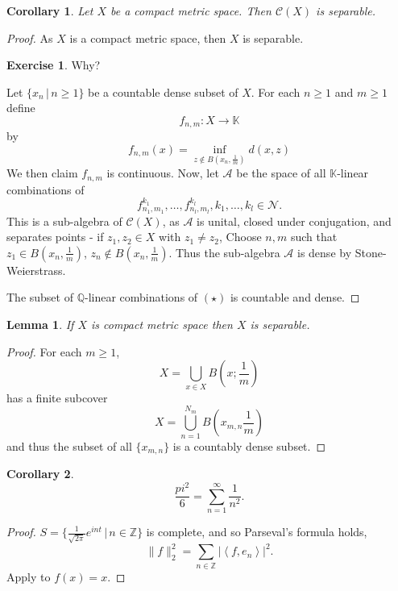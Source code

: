 \documentclass[10pt, oneside, reqno]{amsart}
\theoremstyle{plain}%
\newtheorem{lem}[thm]{Lemma}
\newtheorem*{cor}{Corollary}
\theoremstyle{definition}
\newtheorem{exer}[thm]{Exercise}
\theoremstyle{remark}
\newcommand{\given}{ \, | \,}
\newcommand{\Q}{\mathbb{Q}}
\newcommand{\K}{\mathbb{K}}
\newcommand{\Z}{\mathbb{Z}}
\newcommand{\iprod}[1]{\left\langle #1 \right\rangle}
\begin{document}
\begin{cor}
    Let $X$ be a compact metric space.  Then $\mathcal C(X)$ is separable.
\end{cor}
\begin{proof}
    As $X$ is a compact metric space, then $X$ is separable.  
    \begin{exer}
        Why?
    \end{exer}
    Let $\{ x_n \given n \geq 1 \}$ be a countable dense subset of $X$.  For each $n \geq 1$ and $m \geq 1$ define \[
        f_{n,m} : X \rightarrow \K
    \] by \[f_{n,m}(x) = \inf_{z \notin B(x_n, \frac{1}{m})} d(x,z)\]
    We then claim $f_{n,m}$ is continuous.  Now, let $\mathcal{A}$ be the space of all $\K$-linear combinations of \begin{equation*}
        f^{k_1}_{n_1,m_1}, \dots, f_{n_l, m_l}^{k_l}, k_1, \dots, k_l \in \mathcal{N}. \tag{$\star$}
    \end{equation*}
 This is a sub-algebra of $\mathcal C(X)$, as $\mathcal A$ is unital, closed under conjugation, and separates points - if $z_1, z_2 \in X$ with $z_1 \neq z_2$, Choose $n,m$ such that $z_1 \in B(x_n, \frac{1}{m})$, $z_n \notin B(x_n, \frac{1}{m})$.  Thus the sub-algebra $\mathcal A$ is dense by Stone-Weierstrass.  
    
    The subset of $\Q$-linear combinations of $(\star)$ is countable and dense.
\end{proof}

\begin{lem}
    If $X$ is compact metric space then $X$ is separable.  
\end{lem}
\begin{proof}
    For each $m \geq 1$, \[
        X = \bigcup_{x \in X} B(x ; \frac{1}{m})
    \]  has a finite subcover \[
        X = \bigcup_{n=1}^{N_m} B(x_{m,n} \frac{1}{m})
    \] and thus the subset of all $\{x_{m,n} \}$ is a countably dense subset. 
\end{proof}

\begin{cor}
    \[
    \frac{pi^2}{6} = \sum_{n = 1}^\infty \frac{1}{n^2}.
    \] 
\end{cor}

\begin{proof}
    $S = \{ \frac{1}{\sqrt{2 \pi}} e^{i nt } \given n \in \Z \}$ is complete, and so Parseval's formula holds, \[
        \| f \|_2^2 = \sum_{ n \in \Z} | \iprod{f, e_n} |^2.
    \]  Apply to $f(x) = x$.  
\end{proof}
\end{document}

